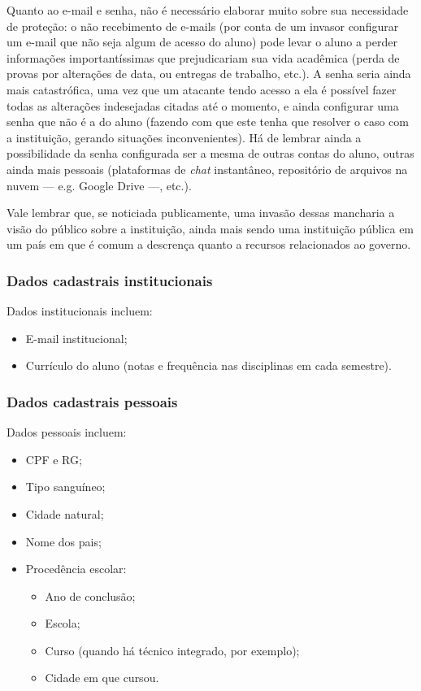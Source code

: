 \documentclass{article}
\begin{document}
    Quanto ao e-mail e senha, não é necessário elaborar muito sobre sua
    necessidade de proteção: o não recebimento de e-mails (por conta de um
    invasor configurar um e-mail que não seja algum de acesso do aluno) pode
    levar o aluno a perder informações importantíssimas que prejudicariam sua
    vida acadêmica (perda de provas por alterações de data, ou entregas de
    trabalho, etc.). A senha seria ainda mais catastrófica, uma vez que um
    atacante tendo acesso a ela é possível fazer todas as alterações
    indesejadas citadas até o momento, e ainda configurar uma senha que não é a
    do aluno (fazendo com que este tenha que resolver o caso com a instituição,
    gerando situações inconvenientes). Há de lembrar ainda a possibilidade da
    senha configurada ser a mesma de outras contas do aluno, outras ainda mais
    pessoais (plataformas de \textit{chat} instantâneo, repositório de arquivos
    na nuvem --- e.g. Google Drive ---, etc.).

    Vale lembrar que, se noticiada publicamente, uma invasão dessas mancharia a
    visão do público sobre a instituição, ainda mais sendo uma instituição
    pública em um país em que é comum a descrença quanto a recursos
    relacionados ao governo.

    \subsubsection{Dados cadastrais institucionais~\label{sub:data-inst}}

    Dados institucionais incluem:

    \begin{itemize}
        \item E-mail institucional;
        \item Currículo do aluno (notas e frequência nas disciplinas em cada
            semestre).
    \end{itemize}

    \subsubsection{Dados cadastrais pessoais~\label{sub:data-pers}}

    Dados pessoais incluem:

    \begin{itemize}
        \item CPF e RG\@;
        \item Tipo sanguíneo;
        \item Cidade natural;
        \item Nome dos pais;
        \item Procedência escolar:
            \begin{itemize}
                \item Ano de conclusão;
                \item Escola;
                \item Curso (quando há técnico integrado, por exemplo);
                \item Cidade em que cursou.
            \end{itemize}
    \end{itemize}
\end{document}
